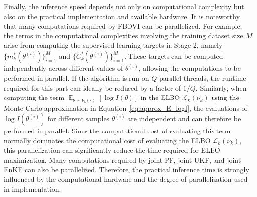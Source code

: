 \documentclass[preprint,3p,times]{elsarticle}
\DeclareMathOperator{\E}{\mathbb{E}}
\begin{document}
Finally, the inference speed depends not only on computational complexity but also on the practical implementation and available hardware. It is noteworthy that many computations required by FBOVI can be parallelized. For example, the terms in the computational complexities involving the training dataset size $M$ arise from computing the supervised learning targets in Stage 2, namely $\{m_k^*(\theta^{(i)})\}_{i=1}^M$ and $\{C_k^*(\theta^{(i)})\}_{i=1}^M$. These targets can be computed independently across different values of $\theta^{(i)}$, allowing the computations to be performed in parallel. If the algorithm is run on $Q$ parallel threads, the runtime required for this part can ideally be reduced by a factor of $1/Q$. Similarly, when computing the term $\E_{\theta \sim \nu_k(\cdot)}[\log I(\theta)]$ in the ELBO $\mathcal{L}_k(\nu_k)$ using the Monte Carlo approximation in Equation~\eqref{eq:approx_E_logI}, the evaluations of $\log I(\theta^{(i)})$ for different samples $\theta^{(i)}$ are independent and can therefore be performed in parallel. Since the computational cost of evaluating this term normally dominates the computational cost of evaluating the ELBO $\mathcal{L}_k(\nu_k)$, this parallelization can significantly reduce the time required for ELBO maximization. Many computations required by joint PF, joint UKF, and joint EnKF can also be parallelized. Therefore, the practical inference time is strongly influenced by the computational hardware and the degree of parallelization used in implementation.
\end{document}
